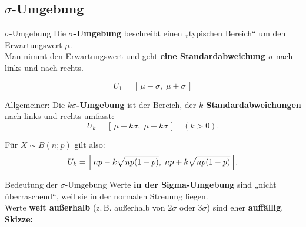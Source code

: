 \subsection{\texorpdfstring{\(\sigma\)}{Sigma}-Umgebung}
\begin{defi}{\(\sigma\)-Umgebung}{} 
Die \textbf{\( \sigma\)-Umgebung} beschreibt einen „typischen Bereich“ um den Erwartungswert \(\mu\).\\
Man nimmt den Erwartungswert und geht \textbf{eine Standardabweichung \(\sigma\)} nach links und nach rechts.

\[
U_{1}=[\,\mu-\sigma,\;\mu+\sigma\,]
\]

Allgemeiner: Die \textbf{\(k\sigma\)-Umgebung} ist der Bereich, der \textbf{\(k\) Standardabweichungen} nach links und rechts umfasst:
\[
U_{k}=[\,\mu-k\sigma,\;\mu+k\sigma\,]\quad (k>0).
\]

Für \(X\sim B(n;p)\) gilt also:
\[
U_{k}=\Bigl[\,np-k\sqrt{np(1-p)},\;np+k\sqrt{np(1-p)}\,\Bigr].
\]    
\end{defi}
\begin{b8d}{Bedeutung der \(\sigma\)-Umgebung}{}
Werte \textbf{in der Sigma-Umgebung} sind „nicht überraschend“, weil sie in der normalen Streuung liegen.\\
Werte \textbf{weit außerhalb} (z.\,B. außerhalb von \(2\sigma\) oder \(3\sigma\)) sind eher \textbf{auffällig}.\\
\vspace{2mm}
\noindent\textbf{Skizze:}
\begin{center}
\end{center}
\end{b8d}
